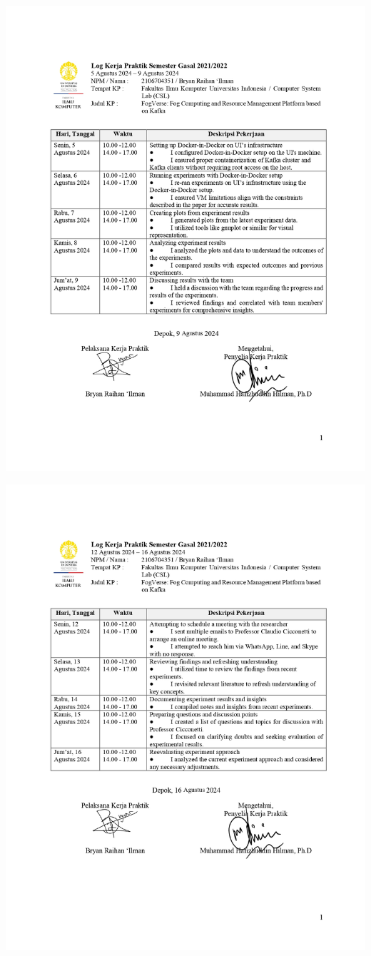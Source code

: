 \includegraphics[width=1\textwidth]{assets/pics/Log-10-CSL-Bryan Raihan Ilman-0001.jpg}

\includegraphics[width=1\textwidth]{assets/pics/Log-11-CSL-Bryan Raihan Ilman-0001.jpg}

